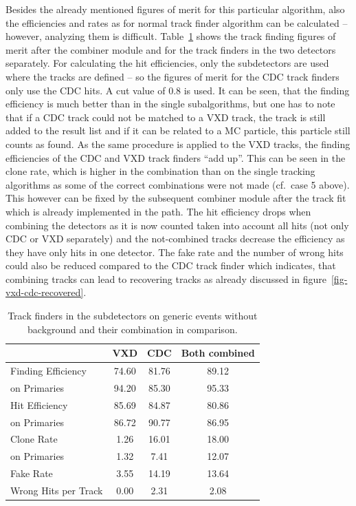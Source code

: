 Besides the already mentioned figures of merit for this particular algorithm, also the efficiencies and rates as for normal track finder algorithm can be calculated -- however, analyzing them is difficult. Table~\ref{tab-vxd-cdc-fom} shows the track finding figures of merit after the combiner module and for the track finders in the two detectors separately. For calculating the hit efficiencies, only the subdetectors are used where the tracks are defined -- so the figures of merit for the CDC track finders only use the CDC hits. A cut value of 0.8 is used. It can be seen, that the finding efficiency is much better than in the single subalgorithms, but one has to note that if a CDC track could not be matched to a VXD track, the track is still added to the result list and if it can be related to a MC particle, this particle still counts as found. As the same procedure is applied to the VXD tracks, the finding efficiencies of the CDC and VXD track finders ``add up''. This can be seen in the clone rate, which is higher in the combination than on the single tracking algorithms as some of the correct combinations were not made (cf.\ case 5 above). This however can be fixed by the subsequent combiner module after the track fit which is already implemented in the path. The hit efficiency drops when combining the detectors as it is now counted taken into account all hits (not only CDC or VXD separately) and the not-combined tracks decrease the efficiency as they have only hits in one detector. The fake rate and the number of wrong hits could also be reduced compared to the CDC track finder which indicates, that combining tracks can lead to recovering tracks as already discussed in figure~\ref{fig-vxd-cdc-recovered}.

\begin{table}
  \centering
  \caption{Track finders in the subdetectors on generic events without background and their combination in comparison.}
  \label{tab-vxd-cdc-fom}
  \begin{tabular}{lccc} \toprule
    & VXD & CDC & Both combined \\ \midrule
    Finding Efficiency   & 74.60 & 81.76 & 89.12 \\
    \quad on Primaries   & 94.20 & 85.30 & 95.33 \\ 
    Hit Efficiency       & 85.69 & 84.87 & 80.86 \\
    \quad on Primaries   & 86.72 & 90.77 & 86.95 \\ 
    Clone Rate           & 1.26 & 16.01 & 18.00 \\
    \quad on Primaries   & 1.32 & 7.41 & 12.07 \\ 
    Fake Rate            & 3.55 & 14.19 & 13.64 \\ 
    Wrong Hits per Track & 0.00 & 2.31 & 2.08 \\ \bottomrule
  \end{tabular}
\end{table}


